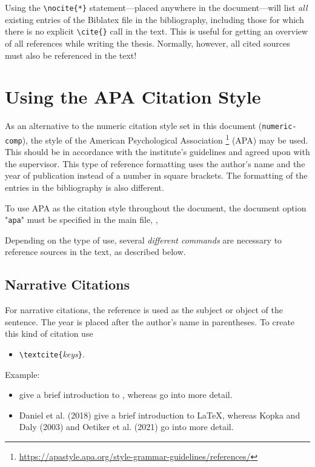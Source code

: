 Using the \verb!\nocite{*}! statement---placed anywhere in the document---will
list \emph{all} existing entries of the Biblatex file in the bibliography,
including those for which there is no explicit \verb!\cite{}! call in the text.
This is useful for getting an overview of all references while writing the thesis.
Normally, however, all cited sources must also be referenced in the text!


\section{Using the APA Citation Style}

As an alternative to the numeric citation style set in this document
(\texttt{numeric-comp}), the style of the American Psychological Association%
\footnote{\url{https://apastyle.apa.org/style-grammar-guidelines/references/}}
(APA) may be used. This should be in accordance with the institute's guidelines
and agreed upon with the supervisor. This type of reference formatting uses the
author's name and the year of publication instead of a number in square
brackets. The formatting of the entries in the bibliography is also different.

To use APA as the citation style throughout the document, the document option
"\texttt{apa}" must be specified in the main file, \eg,
%
%
Depending on the type of use, several \emph{different commands} are necessary
to reference sources in the text, as described below.

\subsection{Narrative Citations}

For narrative citations, the reference is used as the subject or object of the
sentence. The year is placed after the author's name in parentheses. To create
this kind of citation use 
%
\begin{itemize}
    \item[] \verb!\textcite{!\textit{keys}\verb!}!.
\end{itemize}
%
Example:
%
\begin{itemize}
\item[]
\begin{LaTeXCode}[numbers=none,breakindent=0pt]
\textcite{Daniel2018} give a brief introduction to \latex, whereas
\textcite{Oetiker2021, Kopka2003} go into more detail.
\end{LaTeXCode}
\item[]
    Daniel et al. (2018) give a brief introduction to LaTeX, whereas Kopka and
    Daly (2003) and Oetiker et al. (2021) go into more detail.
\end{itemize}


